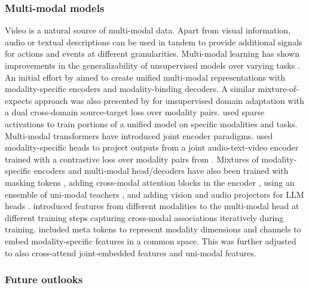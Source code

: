 \subsubsection{Multi-modal models}

Video is a natural source of multi-modal data. Apart from visual information, audio or textual descriptions can be used in tandem to provide additional signals for actions and events at different granularities. Multi-modal learning has shown improvements in the generalizability of unsupervised models \citep{ngiam2011multimodal} over varying tasks \citep{paredes2012exploiting}. An initial effort by \citet{kaiser2017one} aimed to create unified multi-modal representations with modality-specific encoders and modality-binding decoders. A similar mixture-of-expects approach was also presented by \citet{munro2020multi} for unsupervised domain adaptation with a dual cross-domain source-target loss over modality pairs. \citet{dai2022one} used sparse activations to train portions of a unified model on specific modalities and tasks. Multi-modal transformers have introduced joint encoder paradigms. \citet{akbari2021vatt} used modality-specific heads to project outputs from a joint audio-text-video encoder trained with a contrastive loss over modality pairs from \citet{miech2020end}. Mixtures of modality-specific encoders and multi-modal head/decoders have also been trained with masking tokens \citep{zellers2022merlot}, adding cross-modal attention blocks in the encoder \citep{recasens2023zorro}, using an ensemble of uni-modal teachers \citep{radevski2023multimodal}, and adding vision and audio projectors for LLM heads \citep{zhang2023video}. \citet{zhang2024multimodal} introduced features from different modalities to the multi-modal head at different training steps capturing cross-modal associations iteratively during training. \citet{srivastava2024omnivec} included meta tokens to represent modality dimensions and channels to embed modality-specific features in a common space. This was further adjusted \citep{srivastava2024omnivec2} to also cross-attend joint-embedded features and uni-modal features.





\subsubsection{Future outlooks}


